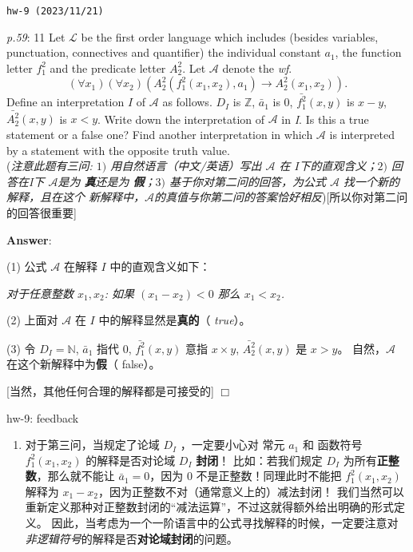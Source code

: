\documentclass[UTF8,12pt,a4paper]{ctexart}
\begin{document}
\noindent\texttt{hw-9 (2023/11/21)}

\emph{p.59}: 11 \quad
Let $\mathscr{L}$ be the first order language which includes (besides variables, punctuation, 
connectives and quantifier) the individual constant $a_1$, the function letter $f^2_1$ and the predicate letter $A^2_2$. 
Let $\mathscr{A}$ denote the \textit{wf}.
\[
(\forall x_1)(\forall x_2)( A^2_2 ( f^2_1(x_1,x_2), a_1)  \to A^2_2 (x_1,x_2) ).
\]
Define an interpretation $I$ of $\mathscr{A}$ as follows. 
$D_I$ is $\mathbb{Z}$, $\bar{a}_1$ is $0$, $\bar{f^2_1} (x, y)$ is $x-y$, 
$\bar{A^2_2}(x,y)$ is $x < y$. 
Write down the interpretation of $\mathscr{A}$ in \textit{I}. 
Is this a true statement or a false one? 
Find another interpretation in which $\mathscr{A}$ is interpreted by a statement with the opposite truth value. \\
(\textit{注意此题有三问: $1)$ 用自然语言（中文/英语）写出 $\mathscr{A}$ 在 $I$下的直观含义；$2)$ 回答在\textit{I}下 $\mathscr{A}$是为\textbf{{\color{purple} 真}}还是为\textbf{{\color{purple} 假}}；$3)$ 基于你对第二问的回答，为公式 $\mathscr{A}$ 找一个新的解释，且在这个{\color{purple} 新}解释中，$\mathscr{A}$的真值与你第二问的答案恰好相反})[所以你对第二问的回答很重要]

\noindent\textbf{Answer}:   

(1) 公式 $\mathscr{A}$ 在解释 $I$ 中的直观含义如下： 

\hspace{6em} \textit{对于任意整数 $x_1, x_2$: 如果  $(x_1 - x_2) < 0$ 那么 $x_1 < x_2$.}


(2) 上面对 $\mathscr{A}$ 在 $I$ 中的解释显然是\textbf{真的}（{\color{purple} \textit{true}}）。 


(3) 令 $D_I = \mathbb{N}$, $\bar{a}_1$ 指代 $0$, $\bar{f^2_1} (x, y)$ 意指 $x \times y$,  $\bar{A^2_2}(x,y)$ 是 $x > y$。
自然，$\mathscr{A}$ 在这个新解释中为\textbf{假}（{\color{purple} false}）。
 
[当然，其他任何合理的解释都是可接受的]
\hfill $\Box$


\vspace{1em}

\dotfill hw-9: feedback
\dotfill

\begin{enumerate}
	\item 对于第三问，当规定了论域 $D_I$ ，一定要小心对 常元 $a_1$ 和 函数符号 $f^2_1(x_1,x_2)$ 的解释是否对论域 $D_I$ {\color{red} \textbf{封闭}}！
	比如：若我们规定 $D_I$ 为所有\textbf{正整数}，那么就不能让 $\bar{a}_1 = 0$，因为 $0$ 不是正整数！同理此时不能把 $f^2_1(x_1,x_2)$ 解释为 $x_1 - x_2$，因为正整数不对（通常意义上的）减法封闭！
	我们当然可以重新定义那种对正整数封闭的“减法运算”，不过这就得额外给出明确的形式定义。
	因此，当考虑为一个一阶语言中的公式寻找解释的时候，一定要注意对{\color{purple} \textit{非逻辑符号}}的解释是否\textbf{对论域封闭}的问题。
\end{enumerate}
\end{document}
